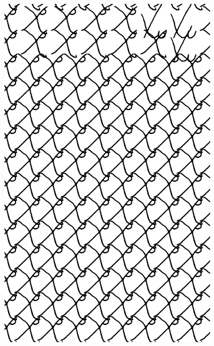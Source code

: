 \makeatletter\@openrightfalse
\movetooddpage
\begin{absolutelynopagebreak}
\begin{vplace}
\begin{figure}[H]
\begin{adjustwidth}{-0.99cm}{}
  \centering
  \vspace*{-1.97cm}
  \hspace*{-0.65cm}
  \includegraphics[width=115mm]{./imgs/img2.pdf}  
  \hfill
\end{adjustwidth}

\thispagestyle{empty}

\end{figure}
\end{vplace}

\end{absolutelynopagebreak}

